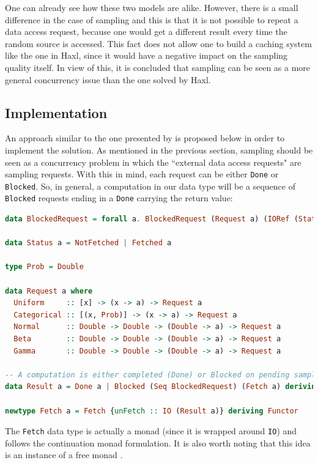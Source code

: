 \documentclass[
  oneside,
  11pt, a4paper,
  footinclude=true,
  headinclude=true,
  cleardoublepage=empty
]{scrbook}
\theoremstyle{definition}
\theoremstyle{definition}
\begin{document}
    One can already see how these two models are alike. However, there is a small difference in the case of sampling and this is that it is not possible to repeat a data access request, because one would get a different result every time the random source is accessed. This fact does not allow one to build a caching system like the one in Haxl, since it would have a negative impact on the sampling quality itself. In view of this, it is concluded that sampling can be seen as a more general concurrency issue than the one solved by Haxl.
    
    \subsection{Implementation}
    
    An approach similar to the one presented by \cite{Marlow:2014:NFA:2692915.2628144} is proposed below in order to implement the solution. As mentioned in the previous section, sampling should be seen as a concurrency problem in which the ``external data access requests" are sampling requests. With this in mind, each request can be either \texttt{Done} or \texttt{Blocked}. So, in general, a computation in our data type will be a sequence of \texttt{Blocked} requests ending in a \texttt{Done} carrying the return value:
    
    \begin{lstlisting}[language=Haskell, caption={Fetch Data Type},captionpos=b]
data BlockedRequest = forall a. BlockedRequest (Request a) (IORef (Status a))

data Status a = NotFetched | Fetched a

type Prob = Double

data Request a where
  Uniform     :: [x] -> (x -> a) -> Request a
  Categorical :: [(x, Prob)] -> (x -> a) -> Request a
  Normal      :: Double -> Double -> (Double -> a) -> Request a
  Beta        :: Double -> Double -> (Double -> a) -> Request a
  Gamma       :: Double -> Double -> (Double -> a) -> Request a

-- A computation is either completed (Done) or Blocked on pending sample requests
data Result a = Done a | Blocked (Seq BlockedRequest) (Fetch a) deriving Functor

newtype Fetch a = Fetch {unFetch :: IO (Result a)} deriving Functor
    \end{lstlisting}
    
The \texttt{Fetch} data type is actually a monad (since it is wrapped around \texttt{IO}) and follows the continuation monad formulation. It is also worth noting that this idea is an instance of a free monad \citep{Marlow:2014:NFA:2692915.2628144}.
\end{document}

